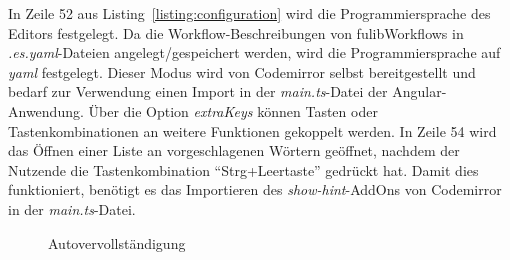 In Zeile 52 aus Listing~\ref{listing:configuration} wird die Programmiersprache des Editors festgelegt.
Da die Workflow-Beschreibungen von fulibWorkflows in \textit{.es.yaml}-Dateien angelegt/gespeichert werden, wird die Programmiersprache auf \textit{yaml} festgelegt.
Dieser Modus wird von Codemirror selbst bereitgestellt und bedarf zur Verwendung einen Import in der \textit{main.ts}-Datei der Angular-Anwendung.
Über die Option \textit{extraKeys} können Tasten oder Tastenkombinationen an weitere Funktionen gekoppelt werden.
In Zeile 54 wird das Öffnen einer Liste an vorgeschlagenen Wörtern geöffnet, nachdem der Nutzende die Tastenkombination ``Strg+Leertaste'' gedrückt hat.
Damit dies funktioniert, benötigt es das Importieren des \textit{show-hint}-AddOns von Codemirror in der \textit{main.ts}-Datei.

\begin{figure}%
    \centering
    \qquad
    \caption{Autovervollständigung}%
    \label{fig:autocompletion}%
\end{figure}


